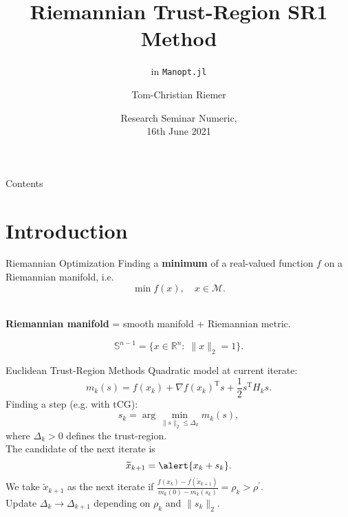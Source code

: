 \documentclass{beamer}
\title{Riemannian Trust-Region SR1 Method}
\subtitle{in \lstinline!Manopt.jl!}
\author{Tom-Christian Riemer}
\institute{TU Chemnitz}
\date{Research Seminar Numeric,\\ 16th June 2021}
\begin{document}
\maketitle

\begin{frame}{Contents}
	\tableofcontents
\end{frame}

\section{Introduction}

\begin{frame}{Riemannian Optimization}
    Finding a \textbf{minimum} of a real-valued function $f$ on a Riemannian manifold, i.e. \\
    \begin{equation*}
        \min f(x), \quad x \in \mathcal{M}.
    \end{equation*}\\[1.\baselineskip]
    \begin{center}
        \textbf{Riemannian manifold} = smooth manifold + Riemannian metric. \\[1.\baselineskip]
    \end{center}
    \begin{equation*}
        \mathbb{S}^{n-1} = \{ x \in \mathbb{R}^n \colon \; \lVert x \rVert_2 = 1 \}.
    \end{equation*}
\end{frame}

\begin{frame}{Euclidean Trust-Region Methods}
    \alert{Quadratic model} at current iterate:
	\begin{equation*}
    	m_k(s) = f(x_k) + {\nabla f(x_k)}^{\mathrm{T}} s + \frac{1}{2} s^{\mathrm{T}} H_k s.
    \end{equation*}
	Finding a \alert{step} (e.g. with tCG):
	\begin{equation*}
        s_k = \arg \min_{\lVert s \rVert_2 \leq \Delta_k} m_k(s),
    \end{equation*}
	where $\Delta_k > 0$ defines the \alert{trust-region}. \\
    The candidate of the next iterate is
	\begin{equation*}
        \widetilde{x}_{k+1} = \alert{x_k + s_k}.
    \end{equation*}
	We take $\widetilde{x}_{k+1}$ as the next iterate if $\frac{f(x_k) - f(\widetilde{x}_{k+1})}{m_k(0) - m_k(s_k)} =\rho_k > \rho^{\prime}$. \\[0.1\baselineskip]
    Update $\Delta_k \rightarrow \Delta_{k+1}$ depending on $\rho_k$ and $\lVert s_k \rVert_2$.
\end{frame}
\end{document}
